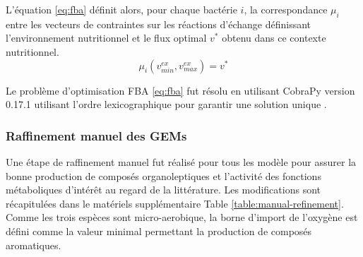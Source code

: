 \documentclass[../main.tex]{subfiles}
\begin{document}
L'équation \eqref{eq:fba} définit alors, pour chaque bactérie $i$, la correspondance $\mu_{i}$ entre les vecteurs de contraintes sur les réactions d'échange définissant l'environnement nutritionnel et le flux optimal $v^*$ obtenu dans ce contexte nutritionnel.
\begin{equation}
\mu_{i}(v_{min}^{ex},v_{max}^{ex}) = v^*
\label{eq:mu-fba}
\end{equation}

Le problème d'optimisation FBA \eqref{eq:fba} fut résolu en utilisant CobraPy \citep{Ebrahim2013}version 0.17.1 utilisant l'ordre lexicographique pour garantir une solution unique \citep{gomez2014dfbalab}.

\subsubsection{Raffinement manuel des GEMs} Une étape de raffinement manuel fut réalisé pour tous les modèle pour assurer la bonne production de composés organoleptiques et l'activité des fonctions métaboliques d'intérêt au regard de la littérature. Les modifications sont récapitulées dans le matériels supplémentaire Table \ref{table:manual-refinement}. Comme les trois espèces sont micro-aerobique, la borne d'import de l'oxygène est défini comme la valeur minimal permettant la production de composés aromatiques.
\end{document}
